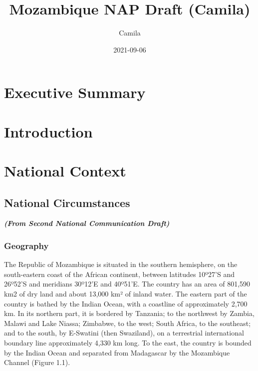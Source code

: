 \documentclass[
]{book}
\title{Mozambique NAP Draft (Camila)}
\author{Camila}
\date{2021-09-06}
\begin{document}
\maketitle

{
\setcounter{tocdepth}{1}
\tableofcontents
}
\hypertarget{executive-summary}{%
\chapter{Executive Summary}\label{executive-summary}}

\hypertarget{introduction}{%
\chapter{Introduction}\label{introduction}}

\hypertarget{national-context}{%
\chapter{National Context}\label{national-context}}

\hypertarget{national-circumstances}{%
\section{National Circumstances}\label{national-circumstances}}

\textbf{\emph{(From Second National Communication Draft)}}

\hypertarget{geography}{%
\subsection{Geography}\label{geography}}

The Republic of Mozambique is situated in the southern hemisphere, on the south-eastern coast of the African continent, between latitudes 10º27'S and 26º52'S and meridians 30º12'E and 40º51'E. The country has an area of 801,590 km2 of dry land and about 13,000 km² of inland water. The eastern part of the country is bathed by the Indian Ocean, with a coastline of approximately 2,700 km. In its northern part, it is bordered by Tanzania; to the northwest by Zambia, Malawi and Lake Niassa; Zimbabwe, to the west; South Africa, to the southeast; and to the south, by E-Swatini (then Swaziland), on a terrestrial international boundary line approximately 4,330 km long. To the east, the country is bounded by the Indian Ocean and separated from Madagascar by the Mozambique Channel (Figure 1.1).
\end{document}
